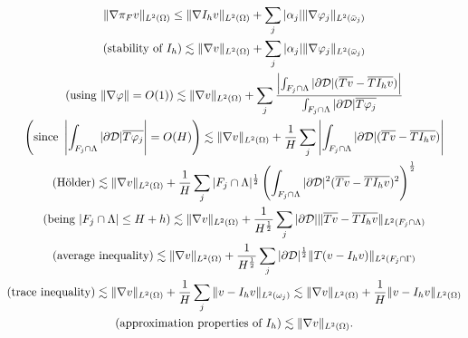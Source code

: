 \begin{multline*}
\|\nabla \pi_F v \|_{L^2(\Omega)} \leq \|\nabla I_h v\|_{L^2(\Omega)} + \sum_j|\alpha_j|\|\nabla \varphi _j\|_{L^2(\bar{\omega}_j)}\\
(\text{stability of }I_h)\lesssim   \|\nabla  v\|_{L^2(\Omega)} + \sum_j|\alpha_j|\|\nabla \varphi _j\|_{L^2(\bar{\omega}_j)}
\\
\left(\text{using }\|\nabla \varphi\|=O(1)\right) \lesssim \|\nabla  v\|_{L^2(\Omega)} + \sum_j \frac{\left|\int_{F_j\cap \Lambda} |\partial\mathcal{D}| (\overline{Tv}-\overline{TI_hv})\right|}{\int_{F_j\cap \Lambda}|\partial\mathcal{D}|\overline{T\varphi_j}}
\\
\left(\text{since }\left|\int_{F_j\cap \Lambda}|\partial\mathcal{D}|\overline{T\varphi_j}\right|=O(H)\right) \lesssim  \|\nabla  v\|_{L^2(\Omega)} + \frac 1H \sum_j \left|\int_{F_j\cap \Lambda} |\partial\mathcal{D}| (\overline{Tv}-\overline{TI_hv})\right| 
\\
(\text{H\"older}) \lesssim  \|\nabla  v\|_{L^2(\Omega)} + \frac 1H \sum_j |F_j\cap \Lambda|^{\frac 12} \left(\int_{F_j\cap \Lambda} |\partial\mathcal{D}|^2(\overline{Tv}-\overline{TI_hv})^2\right)^{\frac 12}
\\
(\text{being }|F_j\cap \Lambda| \leq H+h)\lesssim   \|\nabla  v\|_{L^2(\Omega)} + \frac {1}{H^{\frac 12}} \sum_j  |\partial\mathcal{D}|\| \overline{Tv}-\overline{TI_hv}\|_{L^2(F_j\cap \Lambda)}
\\
(\text{average inequality}) \lesssim \|\nabla  v\|_{L^2(\Omega)} + \frac {1}{H^{\frac 12}} \sum_j |\partial\mathcal{D}|^{\frac 12} \| T(v-I_hv)\|_{L^2(F_j\cap \Gamma)}  
\\
\left(\text{trace inequality} \right)\lesssim   \|\nabla  v\|_{L^2(\Omega)} + \frac {1}{H} \sum_j  \| v-I_h v\|_{L^2(\omega_j)} \lesssim \|\nabla  v\|_{L^2(\Omega)} + \frac {1}{H}  \| v-I_h v\|_{L^2(\Omega)} 
\\
(\text{approximation properties of }I_h)\lesssim \|\nabla  v\|_{L^2(\Omega)}.
\end{multline*}

